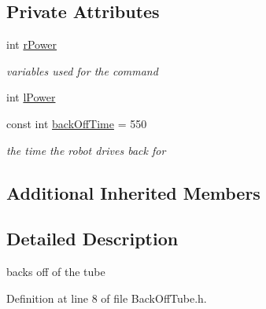 \subsection*{Private Attributes}
\begin{DoxyCompactItemize}
\item 
int \hyperlink{classBackOffTube_aa03d7c0535e3d7dd4c45a0453ea9f3aa}{r\-Power}
\begin{DoxyCompactList}\small\item\em variables used for the command \end{DoxyCompactList}\item 
int \hyperlink{classBackOffTube_a5eee02bb4a6756ea44206e411211aea8}{l\-Power}
\item 
const int \hyperlink{classBackOffTube_a46fdecac50000c6b1e9ecae3e42ea4b4}{back\-Off\-Time} = 550
\begin{DoxyCompactList}\small\item\em the time the robot drives back for \end{DoxyCompactList}\end{DoxyCompactItemize}
\subsection*{Additional Inherited Members}


\subsection{Detailed Description}
backs off of the tube 

Definition at line 8 of file Back\-Off\-Tube.\-h.




